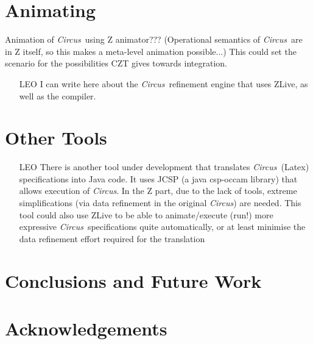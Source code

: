 \documentclass{llncs}
\newcommand{\Circus}{{\sf\slshape Circus}}
\begin{document}
\section{Animating}

    Animation of \Circus\ using Z animator???
      (Operational semantics of \Circus\ are in Z itself, so this makes a meta-level animation possible...)
    This could set the scenario for the possibilities CZT gives towards integration.

    \begin{itemize}
        \item[LEO] I can write here about the \Circus\ refinement engine that uses ZLive, as well as the compiler.
    \end{itemize}


\section{Other Tools}

    \begin{itemize}
        \item[LEO]
        There is another tool under development that translates \Circus\ (Latex) specifications into Java code.
        It uses JCSP (a java csp-occam library) that allows execution of \Circus.
        In the Z part, due to the lack of tools, extreme simplifications (via data refinement in the original \Circus)
        are needed.
        This tool could also use ZLive to be able to animate/execute (run!) more expressive \Circus\ specifications quite
        automatically, or at least minimise the data refinement effort required for the translation
    \end{itemize}


\section{Conclusions and Future Work} \label{sec:conclusions}

\section*{Acknowledgements}



\end{document}
